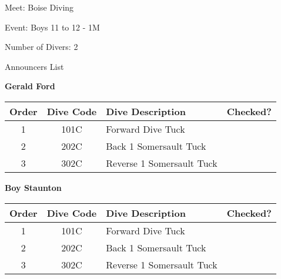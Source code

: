 \documentclass[12pt, letterpaper, portrait]{article}
\begin{document}
    Meet: Boise Diving
    
    Event: Boys 11 to 12 - 1M

	Number of Divers: 2
	
	\begin{center}
		Announcers List
    \end{center}

    \textbf{Gerald Ford}

\begin{table}[h]
		\centering
			\begin{tabularx}{\textwidth}{c c X X}
            Order&Dive Code&Dive Description&Checked?\\\midrule
            1&101C&Forward Dive Tuck&\underline{\hspace{1cm}}\\
2&202C&Back 1 Somersault Tuck&\underline{\hspace{1cm}}\\
3&302C&Reverse 1 Somersault Tuck&\underline{\hspace{1cm}}\\

		\end{tabularx}
	\end{table}

    \vspace{2cm}\textbf{Boy Staunton}

\begin{table}[h]
		\centering
			\begin{tabularx}{\textwidth}{c c X X}
            Order&Dive Code&Dive Description&Checked?\\\midrule
            1&101C&Forward Dive Tuck&\underline{\hspace{1cm}}\\
2&202C&Back 1 Somersault Tuck&\underline{\hspace{1cm}}\\
3&302C&Reverse 1 Somersault Tuck&\underline{\hspace{1cm}}\\

		\end{tabularx}
	\end{table}

    \vspace{2cm}
\end{document}
